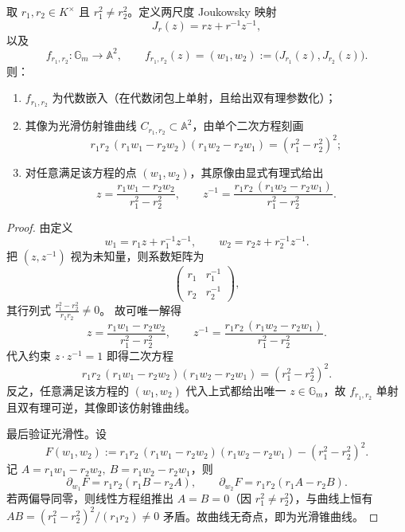 \begin{theorem}[两尺度椭圆投影的代数闭包与显式反演]\label{thm:group-two-scale-conic-embedding}
取 \(r_1,r_2\in K^\times\) 且 \(r_1^2\neq r_2^2\)。定义两尺度 Joukowsky 映射
\[
J_r(z)=r z+r^{-1}z^{-1},
\]
以及
\[
f_{r_1,r_2}:\mathbb{G}_m\to\mathbb{A}^2,\qquad
f_{r_1,r_2}(z)=(w_1,w_2):=\bigl(J_{r_1}(z),J_{r_2}(z)\bigr).
\]
则：
\begin{enumerate}
  \item \(f_{r_1,r_2}\) 为代数嵌入（在代数闭包上单射，且给出双有理参数化）；
  \item 其像为光滑仿射锥曲线 \(C_{r_1,r_2}\subset\mathbb{A}^2\)，由单个二次方程刻画
  \[
  \boxed{\;
  r_1 r_2\,(r_1 w_1-r_2 w_2)(r_1 w_2-r_2 w_1)=(r_1^2-r_2^2)^2;
  \;}
  \]
  \item 对任意满足该方程的点 \((w_1,w_2)\)，其原像由显式有理式给出
  \[
  \boxed{\;
  z=\frac{r_1 w_1-r_2 w_2}{r_1^2-r_2^2},
  \qquad
  z^{-1}=\frac{r_1 r_2\,(r_1 w_2-r_2 w_1)}{r_1^2-r_2^2}.
  \;}
  \]
\end{enumerate}
\end{theorem}
\begin{proof}
由定义
\[
w_1=r_1 z+r_1^{-1}z^{-1},\qquad
w_2=r_2 z+r_2^{-1}z^{-1}.
\]
把 \((z,z^{-1})\) 视为未知量，则系数矩阵为
\[
\begin{pmatrix}
r_1 & r_1^{-1}\\
r_2 & r_2^{-1}
\end{pmatrix},
\]
其行列式
\(
\frac{r_1^2-r_2^2}{r_1 r_2}\neq 0
\)。
故可唯一解得
\[
z=\frac{r_1 w_1-r_2 w_2}{r_1^2-r_2^2},\qquad
z^{-1}=\frac{r_1 r_2\,(r_1 w_2-r_2 w_1)}{r_1^2-r_2^2}.
\]
代入约束 \(z\cdot z^{-1}=1\) 即得二次方程
\[
r_1 r_2\,(r_1 w_1-r_2 w_2)(r_1 w_2-r_2 w_1)=(r_1^2-r_2^2)^2.
\]
反之，任意满足该方程的 \((w_1,w_2)\) 代入上式都给出唯一 \(z\in\mathbb{G}_m\)，故 \(f_{r_1,r_2}\) 单射且双有理可逆，其像即该仿射锥曲线。

最后验证光滑性。设
\[
F(w_1,w_2):=r_1 r_2\,(r_1 w_1-r_2 w_2)(r_1 w_2-r_2 w_1)-(r_1^2-r_2^2)^2.
\]
记 \(A=r_1 w_1-r_2 w_2,\ B=r_1 w_2-r_2 w_1\)，则
\[
\partial_{w_1}F=r_1 r_2(r_1 B-r_2 A),\qquad
\partial_{w_2}F=r_1 r_2(r_1 A-r_2 B).
\]
若两偏导同零，则线性方程组推出 \(A=B=0\)（因 \(r_1^2\neq r_2^2\)），与曲线上恒有
\(
AB=(r_1^2-r_2^2)^2/(r_1 r_2)\neq 0
\)
矛盾。故曲线无奇点，即为光滑锥曲线。
\end{proof}


